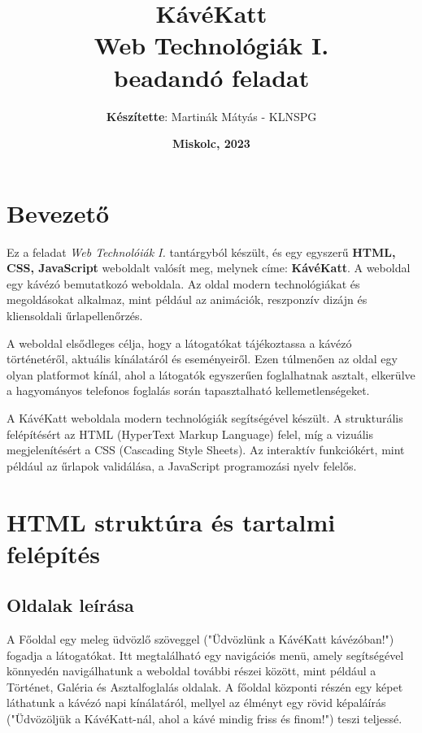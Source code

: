 \documentclass{article}
\begin{document}
	\begin{titlepage}
		\title{\Huge{\textbf{KávéKatt}}\\
				\LARGE{Web Technológiák I.\\beadandó feladat}}
		\author{\Large{\textbf{Készítette}: Martinák Mátyás - KLNSPG}}
		\date{\vspace{390pt}\textbf{Miskolc, 2023}}
		\maketitle
	\end{titlepage}

\tableofcontents
\clearpage

\section{Bevezető}
\indent\indent Ez a feladat \textit{Web Technolóiák I.} tantárgyból készült, és egy egyszerű \textbf{HTML, CSS, JavaScript} weboldalt valósít meg, melynek címe: \textbf{KávéKatt}. A weboldal egy kávézó bemutatkozó weboldala. Az oldal modern technológiákat és megoldásokat alkalmaz, mint például az animációk, reszponzív dizájn és kliensoldali űrlapellenőrzés.

A weboldal elsődleges célja, hogy a látogatókat tájékoztassa a kávézó történetéről, aktuális kínálatáról és eseményeiről. Ezen túlmenően az oldal egy olyan platformot kínál, ahol a látogatók egyszerűen foglalhatnak asztalt, elkerülve a hagyományos telefonos foglalás során tapasztalható kellemetlenségeket.

A KávéKatt weboldala modern technológiák segítségével készült. A strukturális felépítésért az HTML (HyperText Markup Language) felel, míg a vizuális megjelenítésért a CSS (Cascading Style Sheets). Az interaktív funkciókért, mint például az űrlapok validálása, a JavaScript programozási nyelv felelős.

\section{HTML struktúra és tartalmi felépítés}
\subsection{Oldalak leírása}
\indent\indent A Főoldal egy meleg üdvözlő szöveggel ("Üdvözlünk a KávéKatt kávézóban!") fogadja a látogatókat. Itt megtalálható egy navigációs menü, amely segítségével könnyedén navigálhatunk a weboldal további részei között, mint például a Történet, Galéria és Asztalfoglalás oldalak. A főoldal központi részén egy képet láthatunk a kávézó napi kínálatáról, mellyel az élményt egy rövid képaláírás ("Üdvözöljük a KávéKatt-nál, ahol a kávé mindig friss és finom!") teszi teljessé.
\end{document}
